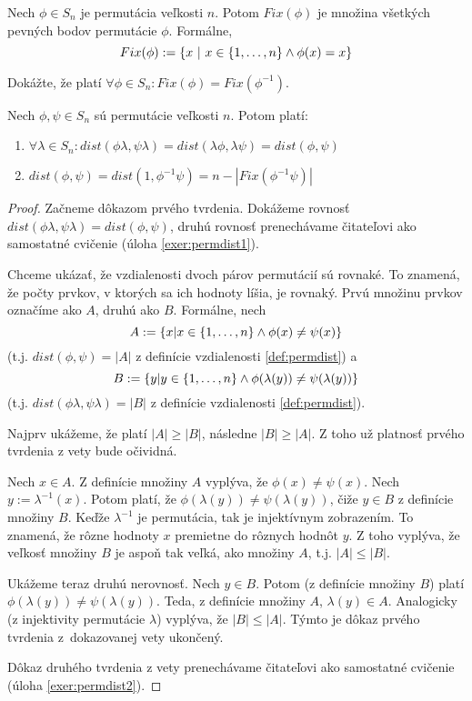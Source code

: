 \begin{definition}
Nech $\phi \in S_n$ je permutácia veľkosti $n$. 
Potom $Fix(\phi)$ je množina všetkých pevných bodov permutácie $\phi$. 
Formálne, 
$$Fix(\phi) := \left\{x ~|~ x \in \left\{1, \ldots, n\right\} \wedge \phi(x) = x\right\}$$ 
\end{definition}


\begin{exercise}
Dokážte, že platí $\forall \phi \in S_n: Fix(\phi) = Fix(\phi^{-1})$.
\end{exercise}



\begin{theorem}
\label{thm:permdist}
Nech $\phi, \psi \in S_n$ sú permutácie veľkosti $n$. Potom platí:

\begin{enumerate}
    \item $\forall \lambda \in S_n: dist(\phi \lambda, \psi \lambda) = dist(\lambda \phi, \lambda \psi) = dist(\phi, \psi)$ 
    \item $dist(\phi, \psi) = dist(1, \phi^{-1} \psi) = n - |Fix(\phi^{-1} \psi)|$
\end{enumerate}
\end{theorem}
\begin{proof}
Začneme dôkazom prvého tvrdenia. 
Dokážeme rovnosť $dist(\phi \lambda, \psi \lambda) = dist(\phi, \psi)$, druhú rovnosť prenechávame čitateľovi ako samostatné cvičenie (úloha \ref{exer:permdist1}).

Chceme ukázať, že vzdialenosti dvoch párov permutácií sú rovnaké. 
To znamená, že počty prvkov, v ktorých sa ich hodnoty líšia, je rovnaký.
Prvú množinu prvkov označíme ako $A$, druhú ako $B$. 
Formálne, nech 
$$A := \left\{x | x \in \left\{1, \ldots, n\right\} \wedge \phi(x) \neq \psi(x)\right\}$$
(t.j. $dist(\phi, \psi) = |A|$ z definície vzdialenosti \ref{def:permdist}) a 
$$B := \left\{y | y \in \left\{1, \ldots, n\right\} \wedge \phi(\lambda(y)) \neq \psi(\lambda(y))\right\}$$ 
(t.j. $dist(\phi\lambda, \psi\lambda) = |B|$ z definície vzdialenosti \ref{def:permdist}).

Najprv ukážeme, že platí $|A| \geq |B|$, následne $|B| \geq |A|$.
Z toho už platnosť prvého tvrdenia z vety bude očividná.

Nech $x \in A$. 
Z definície množiny $A$ vyplýva, že $\phi(x) \neq \psi(x)$. 
Nech $y := \lambda^{-1}(x)$. Potom platí, že $\phi(\lambda(y)) \neq \psi(\lambda(y))$, čiže $y \in B$ z definície množiny $B$.
Keďže $\lambda^{-1}$ je permutácia, tak je injektívnym zobrazením. 
To znamená, že rôzne hodnoty $x$ premietne do rôznych hodnôt $y$. 
Z toho vyplýva, že veľkosť množiny $B$ je aspoň tak veľká, ako množiny $A$, t.j. $|A| \leq |B|$.

Ukážeme teraz druhú nerovnosť. 
Nech $y \in B$. 
Potom (z definície množiny $B$) platí $\phi(\lambda(y)) \neq \psi(\lambda(y))$. 
Teda, z definície množiny $A$, $\lambda(y) \in A$.
Analogicky (z injektivity permutácie $\lambda$) vyplýva, že $|B| \leq |A|$.
Týmto je dôkaz prvého tvrdenia z~dokazovanej vety ukončený.

Dôkaz druhého tvrdenia z vety prenechávame čitateľovi ako samostatné cvičenie (úloha \ref{exer:permdist2}).
\end{proof}

